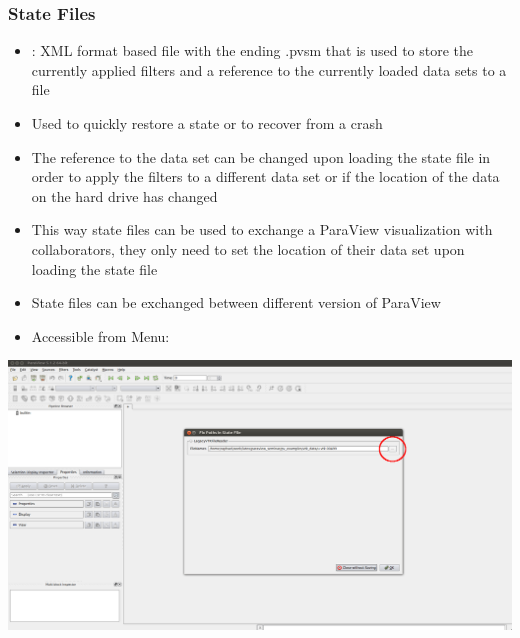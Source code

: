 \begin{frame}
  \frametitle{State Files}

    \begin{itemize}
      \item {}: XML format based file with the ending .pvsm that is used to store the currently applied filters and a reference to the currently loaded data sets to a file
      \item Used to quickly restore a state or to recover from a crash
      \item The reference to the data set can be changed upon loading the state file in order to apply the
        filters to a different data set or if the location of the data on the hard drive has changed
      \item This way state files can be used to exchange a ParaView visualization with collaborators, they only need to set the location of their data set upon loading the state file
      \item State files can be exchanged between different version of ParaView
      \item Accessible from Menu: 
    \end{itemize}
        

\end{frame}

\begin{frame}[plain]
  \vspace{3cm}
  \includegraphics[width=\textwidth]{screenshots/load-state-file.png}
\end{frame}

